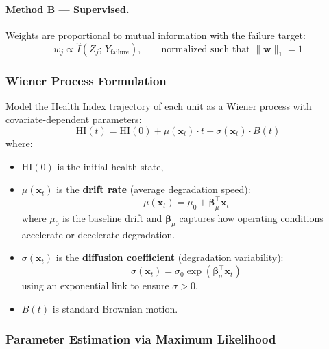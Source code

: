 \documentclass[12pt, a4paper]{article}
\newcommand{\HI}{\mathrm{HI}}
\begin{document}
\paragraph{Method B --- Supervised.} Weights are proportional to mutual information with the failure target:
\begin{equation}
    w_j \propto \hat{I}(Z_j;\, Y_{\mathrm{failure}}), \qquad \text{normalized such that } \|\mathbf{w}\|_1 = 1
\end{equation}

\subsubsection{Wiener Process Formulation}

Model the Health Index trajectory of each unit as a Wiener process with covariate-dependent parameters:
\begin{equation}\label{eq:wiener}
    \HI(t) = \HI(0) + \mu(\mathbf{x}_t)\cdot t + \sigma(\mathbf{x}_t)\cdot B(t)
\end{equation}
where:
\begin{itemize}[leftmargin=*]
    \item $\HI(0)$ is the initial health state,
    \item $\mu(\mathbf{x}_t)$ is the \textbf{drift rate} (average degradation speed):
    \begin{equation}\label{eq:drift}
        \mu(\mathbf{x}_t) = \mu_0 + \boldsymbol{\beta}_\mu^\top \mathbf{x}_t
    \end{equation}
    where $\mu_0$ is the baseline drift and $\boldsymbol{\beta}_\mu$ captures how operating conditions accelerate or decelerate degradation.
    
    \item $\sigma(\mathbf{x}_t)$ is the \textbf{diffusion coefficient} (degradation variability):
    \begin{equation}\label{eq:diffusion}
        \sigma(\mathbf{x}_t) = \sigma_0 \exp\!\left(\boldsymbol{\beta}_\sigma^\top \mathbf{x}_t\right)
    \end{equation}
    using an exponential link to ensure $\sigma > 0$.
    
    \item $B(t)$ is standard Brownian motion.
\end{itemize}

\subsubsection{Parameter Estimation via Maximum Likelihood}
\end{document}
